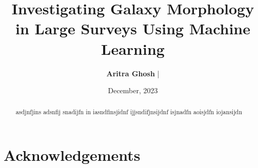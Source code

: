 \documentclass[letterpaper,10pt]{yalephd}
\begin{document}
\title{Investigating Galaxy Morphology in Large Surveys Using Machine Learning} %
\author{\textbf{Aritra Ghosh} | }
\date{December, 2023} %

\frontmatter

\begin{abstract}
asdjnfjins adsnfij snadijfn in iasndfinsjidnf ijjsndifjnsijdnf isjnadfn aoisjdfn iojansijdn
\end{abstract}


\maketitle
{} %
\tableofcontents
\listoffigures %
\listoftables %

\chapter{Acknowledgements} %


\mainmatter



\begin{subappendices}
    
\end{subappendices}

\begin{subappendices}
    
\end{subappendices}

\begin{subappendices}
    
\end{subappendices}



\backmatter



\end{document}
